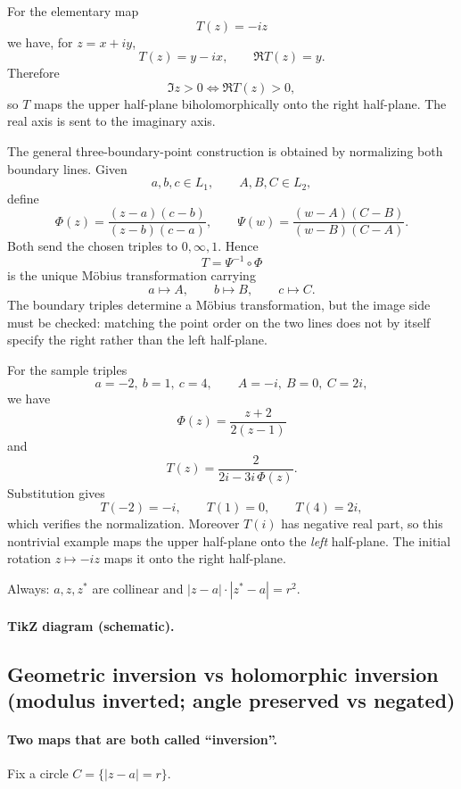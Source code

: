 \begin{solution}
For the elementary map
\[
T(z)=-iz
\]
we have, for \(z=x+iy\),
\[
T(z)=y-ix,
\qquad
\Re T(z)=y.
\]
Therefore
\[
\Im z>0
\iff
\Re T(z)>0,
\]
so \(T\) maps the upper half-plane biholomorphically onto the right half-plane. The real axis is sent to the imaginary axis.

The general three-boundary-point construction is obtained by normalizing both boundary lines. Given
\[
a,b,c\in L_1,\qquad A,B,C\in L_2,
\]
define
\[
\Phi(z)=\frac{(z-a)(c-b)}{(z-b)(c-a)},
\qquad
\Psi(w)=\frac{(w-A)(C-B)}{(w-B)(C-A)}.
\]
Both send the chosen triples to \(0,\infty,1\). Hence
\[
T=\Psi^{-1}\circ\Phi
\]
is the unique M\"obius transformation carrying
\[
a\mapsto A,\qquad b\mapsto B,\qquad c\mapsto C.
\]
The boundary triples determine a M\"obius transformation, but the
image side must be checked: matching the point order on the two lines
does not by itself specify the right rather than the left half-plane.

For the sample triples
\[
a=-2,\ b=1,\ c=4,
\qquad
A=-i,\ B=0,\ C=2i,
\]
we have
\[
\Phi(z)=\frac{z+2}{2(z-1)}
\]
and
\[
T(z)=\frac{2}{2i-3i\,\Phi(z)}.
\]
Substitution gives
\[
T(-2)=-i,\qquad T(1)=0,\qquad T(4)=2i,
\]
which verifies the normalization. Moreover $T(i)$ has negative real
part, so this nontrivial example maps the upper half-plane onto the
\emph{left} half-plane. The initial rotation $z\mapsto-iz$ maps it
onto the right half-plane.
\end{solution}


\begin{problem}[CP-IV-0066]
\label{prob:cp-iv-0066}
\par\noindent\textbullet\quad Always: $a,z,z^{*}$ are collinear and $|z-a|\cdot|z^{*}-a|=r^2$.

\paragraph{\textbf{TikZ diagram (schematic).}}
\begin{center}

\end{center}

\subsection*{\textbf{Geometric inversion vs holomorphic inversion (modulus inverted; angle preserved vs negated)}}

\paragraph{\textbf{Two maps that are both called “inversion”.}}
Fix a circle $C=\{|z-a|=r\}$.
\end{problem}

